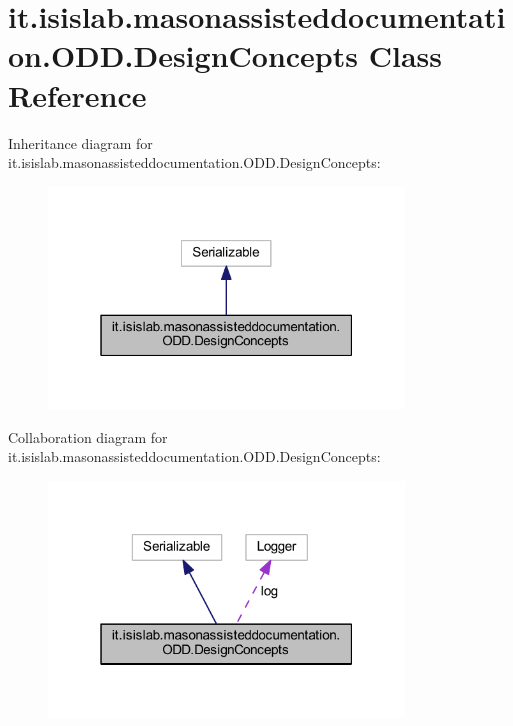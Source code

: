 \hypertarget{classit_1_1isislab_1_1masonassisteddocumentation_1_1_o_d_d_1_1_design_concepts}{\section{it.\-isislab.\-masonassisteddocumentation.\-O\-D\-D.\-Design\-Concepts Class Reference}
\label{classit_1_1isislab_1_1masonassisteddocumentation_1_1_o_d_d_1_1_design_concepts}
}


Inheritance diagram for it.\-isislab.\-masonassisteddocumentation.\-O\-D\-D.\-Design\-Concepts\-:\nopagebreak
\begin{figure}[H]
\begin{center}
\leavevmode
\includegraphics[width=268pt]{classit_1_1isislab_1_1masonassisteddocumentation_1_1_o_d_d_1_1_design_concepts__inherit__graph}
\end{center}
\end{figure}


Collaboration diagram for it.\-isislab.\-masonassisteddocumentation.\-O\-D\-D.\-Design\-Concepts\-:\nopagebreak
\begin{figure}[H]
\begin{center}
\leavevmode
\includegraphics[width=268pt]{classit_1_1isislab_1_1masonassisteddocumentation_1_1_o_d_d_1_1_design_concepts__coll__graph}
\end{center}
\end{figure}
